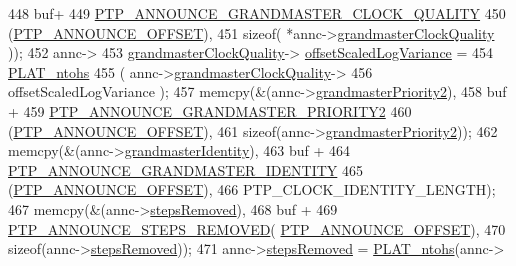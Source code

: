 \begin{DoxyCode}
{{{{{{{{448                 buf+
449                 \hyperlink{avbts__message_8hpp_a972816df3b21a89930e21ac6a9617408}{PTP\_ANNOUNCE\_GRANDMASTER\_CLOCK\_QUALITY}
450                 (\hyperlink{avbts__message_8hpp_aaa3da4fa4e9e4cfe49477cd7f6b95bca}{PTP\_ANNOUNCE\_OFFSET}),
451                 \textcolor{keyword}{sizeof}( *annc->\hyperlink{class_p_t_p_message_announce_aa67cf6cb88ed67b2850993312a7cd5f2}{grandmasterClockQuality} ));
452             annc->
453               \hyperlink{class_p_t_p_message_announce_aa67cf6cb88ed67b2850993312a7cd5f2}{grandmasterClockQuality}->
      \hyperlink{struct_clock_quality_a7106813bdd70baa204ed0c71038fe3a0}{offsetScaledLogVariance} =
454               \hyperlink{linux_2src_2platform_8cpp_a6b8f3e7b87b66fa774a07ddc67f883a7}{PLAT\_ntohs}
455               ( annc->\hyperlink{class_p_t_p_message_announce_aa67cf6cb88ed67b2850993312a7cd5f2}{grandmasterClockQuality}->
456                 offsetScaledLogVariance );
457             memcpy(&(annc->\hyperlink{class_p_t_p_message_announce_a1e9e3c7867bf9eb557e5cf6edbd7f54a}{grandmasterPriority2}),
458                    buf +
459                    \hyperlink{avbts__message_8hpp_ad08230d0bcb3b40a12153ace07e585f9}{PTP\_ANNOUNCE\_GRANDMASTER\_PRIORITY2}
460                    (\hyperlink{avbts__message_8hpp_aaa3da4fa4e9e4cfe49477cd7f6b95bca}{PTP\_ANNOUNCE\_OFFSET}),
461                    \textcolor{keyword}{sizeof}(annc->\hyperlink{class_p_t_p_message_announce_a1e9e3c7867bf9eb557e5cf6edbd7f54a}{grandmasterPriority2}));
462             memcpy(&(annc->\hyperlink{class_p_t_p_message_announce_aac45d13272e7f5bd9b06d2bf44c012af}{grandmasterIdentity}),
463                    buf +
464                    \hyperlink{avbts__message_8hpp_a822a74880e223c13025df7bbfa545b63}{PTP\_ANNOUNCE\_GRANDMASTER\_IDENTITY}
465                    (\hyperlink{avbts__message_8hpp_aaa3da4fa4e9e4cfe49477cd7f6b95bca}{PTP\_ANNOUNCE\_OFFSET}),
466                    PTP\_CLOCK\_IDENTITY\_LENGTH);
467             memcpy(&(annc->\hyperlink{class_p_t_p_message_announce_ab24df4cccbede4b07586878ef0d47395}{stepsRemoved}),
468                    buf +
469                    \hyperlink{avbts__message_8hpp_ad9e2d7ce4d1384fad376314924fa4cea}{PTP\_ANNOUNCE\_STEPS\_REMOVED}(
      \hyperlink{avbts__message_8hpp_aaa3da4fa4e9e4cfe49477cd7f6b95bca}{PTP\_ANNOUNCE\_OFFSET}),
470                    \textcolor{keyword}{sizeof}(annc->\hyperlink{class_p_t_p_message_announce_ab24df4cccbede4b07586878ef0d47395}{stepsRemoved}));
471             annc->\hyperlink{class_p_t_p_message_announce_ab24df4cccbede4b07586878ef0d47395}{stepsRemoved} = \hyperlink{linux_2src_2platform_8cpp_a6b8f3e7b87b66fa774a07ddc67f883a7}{PLAT\_ntohs}(annc->
}}}}}}}}
\end{DoxyCode}
